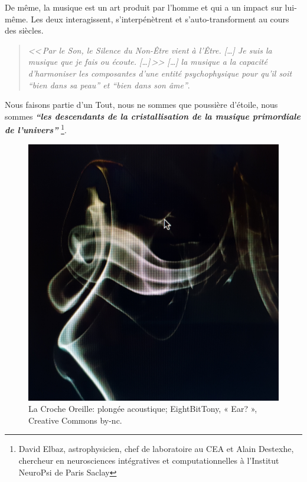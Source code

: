     
 
      De même, la musique est un art produit par l'homme et qui a un impact
sur lui-même. Les deux interagissent, s'interpénètrent et s'auto-transforment
au cours des siècles.
\begin{quotation}
\emph{<<\,\emph{Par le Son, le Silence du Non-Être vient à l'Être}. [\dots]
\textsl{Je suis}
	\emph{la musique que je fais ou écoute}. [\dots]\,>>
[\ldots] \emph{la musique a la capacité d'harmoniser
les composantes d'une entité psychophysique pour qu'il soit ``bien
dans sa peau'' et ``bien dans son âme}''}.\, \autocite[ch. 1, p.8]{viret:b}
\end{quotation}

Nous faisons partie d'un Tout, nous ne sommes que poussière d'étoile,
nous sommes
\textit{\textbf{``les descendants de la  cristallisation de la musique primordiale de
l'univers''}} \autocite{delbaz_recherche_2016} \footnote{David Elbaz, astrophysicien, chef de laboratoire au CEA et Alain
Destexhe, chercheur en neurosciences intégratives et computationnelles
à l'Institut  NeuroPsi de Paris Saclay}.




      \begin{figure}[tbh]
        \centering
        \includegraphics[width=1\linewidth]{images/oreillephoto.jpg}
        \caption{La Croche Oreille: plongée acoustique; EightBitTony, « Ear? », Creative Commons by-nc.}
        \label{fig}
      \end{figure}


